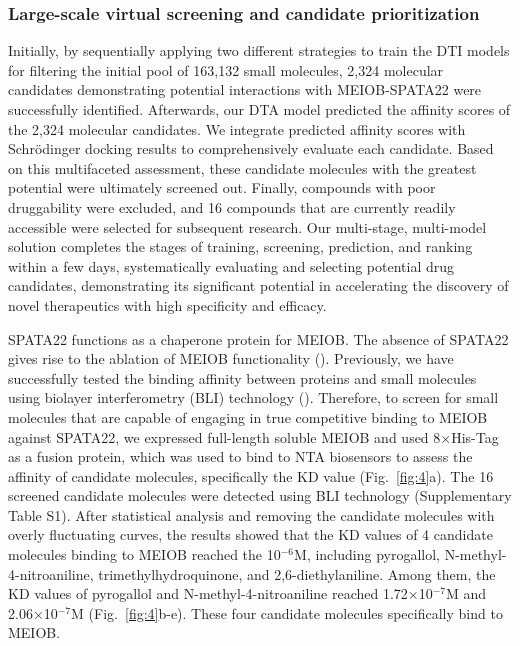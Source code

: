 \documentclass[unnumsec,webpdf,contemporary,large]{oup-authoring-template}%
\theoremstyle{thmstyleone}%
\theoremstyle{thmstyletwo}%
\theoremstyle{thmstylethree}%
\begin{document}
\subsubsection*{Large-scale virtual screening and candidate prioritization}

Initially, by sequentially applying two different strategies to train the DTI models for filtering the initial pool of 163,132 small molecules, 2,324 molecular candidates demonstrating potential interactions with MEIOB-SPATA22 were successfully identified. Afterwards, our DTA model predicted the affinity scores of the 2,324 molecular candidates. We integrate predicted affinity scores with Schrödinger docking results to comprehensively evaluate each candidate. Based on this multifaceted assessment, these candidate molecules with the greatest potential were ultimately screened out. Finally, compounds with poor druggability were excluded, and 16 compounds that are currently readily accessible were selected for subsequent research. Our multi-stage, multi-model solution completes the stages of training, screening, prediction, and ranking within a few days, systematically evaluating and selecting potential drug candidates, demonstrating its significant potential in accelerating the discovery of novel therapeutics with high specificity and efficacy.

SPATA22 functions as a chaperone protein for MEIOB. The absence of SPATA22 gives rise to the ablation of MEIOB functionality (\citealt{6,9,10}). Previously, we have successfully tested the binding affinity between proteins and small molecules using biolayer interferometry (BLI) technology (\citealt{11}). Therefore, to screen for small molecules that are capable of engaging in true competitive binding to MEIOB against SPATA22, we expressed full-length soluble MEIOB and used 8×His-Tag as a fusion protein, which was used to bind to NTA biosensors to assess the affinity of candidate molecules, specifically the $\text{KD}$ value (Fig.~\ref{fig:4}a). The 16 screened candidate molecules were detected using BLI technology (Supplementary Table S1). After statistical analysis and removing the candidate molecules with overly fluctuating curves, the results showed that the $\text{KD}$ values of 4 candidate molecules binding to MEIOB reached the 10$^{-6}$M, including pyrogallol, N-methyl-4-nitroaniline, trimethylhydroquinone, and 2,6-diethylaniline. Among them, the $\text{KD}$ values of pyrogallol and N-methyl-4-nitroaniline reached 1.72×10$^{-7}$M and 2.06×10$^{-7}$M (Fig.~\ref{fig:4}b-e). These four candidate molecules specifically bind to MEIOB.
\end{document}
